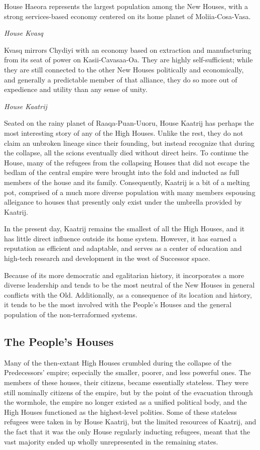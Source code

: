 \documentclass[11pt]{report}
\begin{document}
    House Haeora represents the largest population among the New Houses, with a strong services-based economy centered on its home planet of Moliia-Cosa-Vasa.
    \bigskip

    \noindent
    \emph{House Kvasq}

    Kvasq mirrors Chydiyi with an economy based on extraction and manufacturing from its seat of power on Kasii-Cavasaa-Oa. They are highly self-sufficient; while they are still connected to the other New Houses politically and economically, and generally a predictable member of that alliance, they do so more out of expedience and utility than any sense of unity.
    \bigskip

    \noindent
    \emph{House Kaatrij}

    Seated on the rainy planet of Raaqa-Puan-Uuoru, House Kaatrij has perhaps the most interesting story of any of the High Houses. Unlike the rest, they do not claim an unbroken lineage since their founding, but instead recognize that during the collapse, all the scions eventually died without direct heirs. To continue the House, many of the refugees from the collapsing Houses that did not escape the bedlam of the central empire were brought into the fold and inducted as full members of the house and its family. Consequently, Kaatrij is a bit of a melting pot, comprised of a much more diverse population with many members espousing alleigance to houses that presently only exist under the umbrella provided by Kaatrij.

    In the present day, Kaatrij remains the smallest of all the High Houses, and it has little direct influence outside its home system. However, it has earned a reputation as efficient and adaptable, and serves as a center of education and high-tech research and development in the west of Successor space.

    Because of its more democratic and egalitarian history, it incorporates a more diverse leadership and tends to be the most neutral of the New Houses in general conflicts with the Old. Additionally, as a consequence of its location and history, it tends to be the most involved with the People's Houses and the general population of the non-terraformed systems.
    \bigskip

    \subsection{The People's Houses}

    Many of the then-extant High Houses crumbled during the collapse of the Predecessors' empire; especially the smaller, poorer, and less powerful ones. The members of these houses, their citizens, became essentially stateless. They were still nominally citizens of the empire, but by the point of the evacuation through the wormhole, the empire no longer existed as a unified political body, and the High Houses functioned as the highest-level polities. Some of these stateless refugees were taken in by House Kaatrij, but the limited resources of Kaatrij, and the fact that it was the only House regularly inducting refugees, meant that the vast majority ended up wholly unrepresented in the remaining states.
\end{document}
